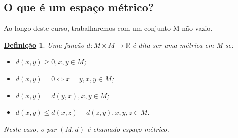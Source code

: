 \documentclass{article}
\newtheorem*{def*}{\underline{Defini\c c\~ao}}
\begin{document}
\subsection*{O que é um espaço métrico?}
  Ao longo deste curso, trabalharemos com um conjunto M não-vazio.
\hypertarget{def_metric}{ \begin{def*}
   Uma função \(d:M\times M\rightarrow \mathbb{R}\) é dita ser uma métrica em M se: 
  \begin{itemize}
    \item[i)] \(d(x, y)\geq 0, x, y\in M\);
    \item[ii)] \(d(x, y) = 0 \Leftrightarrow x = y, x, y\in M\);
    \item[iii)] \(d(x, y) = d(y, x), x, y\in M\);
    \item[iv)] \(d(x, y)\leq d(x, z) + d(z, y), x, y, z\in M\).
  \end{itemize}
  Neste caso, o par \((M, d)\) é chamado espaço métrico.
 \end{def*}
}
\end{document}
